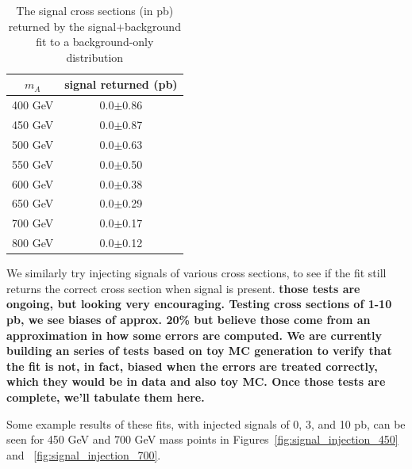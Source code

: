  
\begin{table}
    \center
    \caption{The signal cross sections (in pb) returned by the signal+background fit
    to a background-only distribution
    \label{tab:spurious_signal}}
    \begin{tabular}{ c c } \hline \hline
        $m_A$ & signal returned (pb) \\ \hline
        400 GeV & 0.0$\pm$0.86 \\
        450 GeV & 0.0$\pm$0.87 \\
        500 GeV & 0.0$\pm$0.63 \\
        550 GeV & 0.0$\pm$0.50 \\
        600 GeV & 0.0$\pm$0.38 \\
        650 GeV & 0.0$\pm$0.29 \\
        700 GeV & 0.0$\pm$0.17 \\
        800 GeV & 0.0$\pm$0.12 \\
        \hline
    \end{tabular}
\end{table} 


We similarly try injecting signals of various cross sections, to see if 
the fit still returns the correct cross section when signal is present.
\textbf{those tests are ongoing, but looking very encouraging.  Testing
cross sections of 1-10 pb, we see biases of approx. 20\% but believe
those come from an approximation in how some errors are computed.
We are currently building an series of tests based on toy MC generation
to verify that the fit is not, in fact, biased when the errors are
treated correctly, which they would be in data and also toy MC. Once
those tests are complete, we'll tabulate them here. }


Some example results of these fits, with injected signals of 0, 3, and 10 pb, can 
be seen for 450 GeV and 700 GeV mass points in Figures~\ref{fig:signal_injection_450}
and ~\ref{fig:signal_injection_700}.


